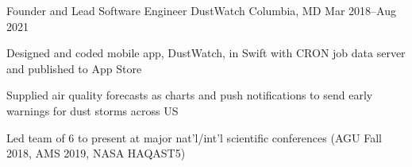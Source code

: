 \experience
{Founder and Lead Software Engineer}
{DustWatch}
{Columbia, MD}
{Mar 2018--Aug 2021}
{
	\item Designed and coded mobile app, DustWatch, in Swift with CRON job data server and published to App Store
	\item Supplied air quality forecasts as charts and push notifications to send early warnings for dust storms across US
	\item Led team of 6 to present at major nat'l/int'l scientific conferences (AGU Fall 2018, AMS 2019, NASA HAQAST5)
}
